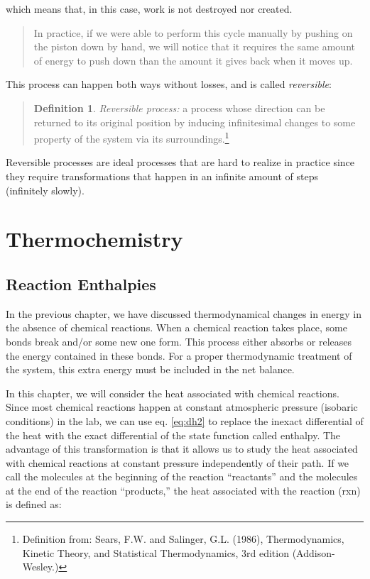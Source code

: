 \documentclass[
  9pt,
]{extbook}
\theoremstyle{definition}
\newtheorem{definition}{Definition}[chapter]
\theoremstyle{definition}
\theoremstyle{definition}
\theoremstyle{remark}
\begin{document}
which means that, in this case, work is not destroyed nor created.

\begin{quote}
In practice, if we were able to perform this cycle manually by pushing on the piston down by hand, we will notice that it requires the same amount of energy to push down than the amount it gives back when it moves up.
\end{quote}

This process can happen both ways without losses, and is called \emph{reversible}:

\begin{quote}
\begin{definition}
\protect\hypertarget{def:reversible}{}{\label{def:reversible} }\emph{Reversible process:} a process whose direction can be returned to its original position by inducing infinitesimal changes to some property of the system via its surroundings.\footnote{Definition from: Sears, F.W. and Salinger, G.L. (1986), Thermodynamics, Kinetic Theory, and Statistical Thermodynamics, 3rd edition (Addison-Wesley.)}
\end{definition}
\end{quote}

Reversible processes are ideal processes that are hard to realize in practice since they require transformations that happen in an infinite amount of steps (infinitely slowly).

\newcommand*{\standardstate}{{-\kern-6pt{\ominus}\kern-6pt-}}

\hypertarget{Thermochemistry}{%
\chapter{Thermochemistry}\label{Thermochemistry}}

\hypertarget{rxnenthalpy}{%
\section{Reaction Enthalpies}\label{rxnenthalpy}}

In the previous chapter, we have discussed thermodynamical changes in energy in the absence of chemical reactions. When a chemical reaction takes place, some bonds break and/or some new one form. This process either absorbs or releases the energy contained in these bonds. For a proper thermodynamic treatment of the system, this extra energy must be included in the net balance.

In this chapter, we will consider the heat associated with chemical reactions. Since most chemical reactions happen at constant atmospheric pressure (isobaric conditions) in the lab, we can use eq. \eqref{eq:dh2} to replace the inexact differential of the heat with the exact differential of the state function called enthalpy. The advantage of this transformation is that it allows us to study the heat associated with chemical reactions at constant pressure independently of their path. If we call the molecules at the beginning of the reaction ``reactants'' and the molecules at the end of the reaction ``products,'' the heat associated with the reaction (rxn) is defined as:
\end{document}
